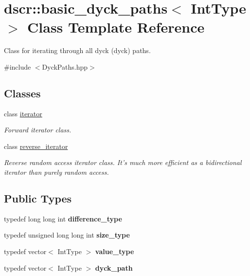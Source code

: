 \hypertarget{classdscr_1_1basic__dyck__paths}{\section{dscr\-:\-:basic\-\_\-dyck\-\_\-paths$<$ Int\-Type $>$ Class Template Reference}
\label{classdscr_1_1basic__dyck__paths}
}


Class for iterating through all dyck (dyck) paths.  




{\ttfamily \#include $<$Dyck\-Paths.\-hpp$>$}

\subsection*{Classes}
\begin{DoxyCompactItemize}
\item 
class \hyperlink{classdscr_1_1basic__dyck__paths_1_1iterator}{iterator}
\begin{DoxyCompactList}\small\item\em Forward iterator class. \end{DoxyCompactList}\item 
class \hyperlink{classdscr_1_1basic__dyck__paths_1_1reverse__iterator}{reverse\-\_\-iterator}
\begin{DoxyCompactList}\small\item\em Reverse random access iterator class. It's much more efficient as a bidirectional iterator than purely random access. \end{DoxyCompactList}\end{DoxyCompactItemize}
\subsection*{Public Types}
\begin{DoxyCompactItemize}
\item 
\hypertarget{classdscr_1_1basic__dyck__paths_a78579b9bf35ad66ed433a1c6626737fe}{typedef long long int {\bfseries difference\-\_\-type}}\label{classdscr_1_1basic__dyck__paths_a78579b9bf35ad66ed433a1c6626737fe}

\item 
\hypertarget{classdscr_1_1basic__dyck__paths_acff15f063518857bc38cd0fc350d9f7d}{typedef unsigned long long int {\bfseries size\-\_\-type}}\label{classdscr_1_1basic__dyck__paths_acff15f063518857bc38cd0fc350d9f7d}

\item 
\hypertarget{classdscr_1_1basic__dyck__paths_ae89ede1b729adabcf3dc23ddafb8803e}{typedef vector$<$ Int\-Type $>$ {\bfseries value\-\_\-type}}\label{classdscr_1_1basic__dyck__paths_ae89ede1b729adabcf3dc23ddafb8803e}

\item 
\hypertarget{classdscr_1_1basic__dyck__paths_af6ab61a948f35e728665aae8b7a49e38}{typedef vector$<$ Int\-Type $>$ {\bfseries dyck\-\_\-path}}\label{classdscr_1_1basic__dyck__paths_af6ab61a948f35e728665aae8b7a49e38}

\end{DoxyCompactItemize}
